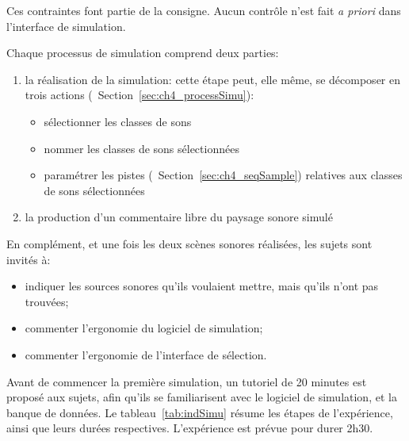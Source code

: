 Ces contraintes font partie de la consigne. Aucun contrôle n'est fait \emph{a priori} dans l'interface de simulation.

Chaque processus de simulation comprend deux parties:

\begin{enumerate}
\item la réalisation de la simulation: cette étape peut, elle même, se décomposer en trois actions (\cf~Section~\ref{sec:ch4_processSimu}):
\begin{itemize}
\item sélectionner les classes de sons
\item nommer les classes de sons sélectionnées
\item paramétrer les pistes (\cf~Section~\ref{sec:ch4_seqSample}) relatives aux classes de sons sélectionnées
\end{itemize}
\item la production d'un commentaire libre du paysage sonore simulé
\end{enumerate}

En complément, et une fois les deux scènes sonores réalisées, les sujets sont invités à:

\begin{itemize}
\item indiquer les sources sonores qu'ils voulaient mettre, mais qu'ils n'ont pas trouvées;
\item commenter l’ergonomie du logiciel de simulation;
\item commenter l’ergonomie de l'interface de sélection.
\end{itemize}

Avant de commencer la première simulation, un tutoriel de 20 minutes est proposé aux sujets, afin qu'ils se familiarisent avec le logiciel de simulation, et la banque de données. Le tableau~\ref{tab:indSimu} résume les étapes de l’expérience, ainsi que leurs durées respectives. L'expérience est prévue pour durer 2h30. \\

